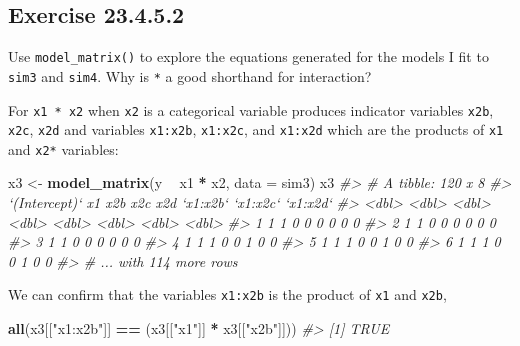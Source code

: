 \documentclass[]{book}
\newenvironment{Shaded}{\begin{snugshade}}{\end{snugshade}}
\newcommand{\CommentTok}[1]{\textcolor[rgb]{0.56,0.35,0.01}{\textit{#1}}}
\newcommand{\DataTypeTok}[1]{\textcolor[rgb]{0.13,0.29,0.53}{#1}}
\newcommand{\KeywordTok}[1]{\textcolor[rgb]{0.13,0.29,0.53}{\textbf{#1}}}
\newcommand{\NormalTok}[1]{#1}
\newcommand{\OperatorTok}[1]{\textcolor[rgb]{0.81,0.36,0.00}{\textbf{#1}}}
\newcommand{\StringTok}[1]{\textcolor[rgb]{0.31,0.60,0.02}{#1}}
\theoremstyle{plain}
\theoremstyle{remark}
\begin{document}
\hypertarget{exercise-23.4.5.2}{%
\subsection*{\texorpdfstring{Exercise
{23.4.5.2}}{Exercise 23.4.5.2}}\label{exercise-23.4.5.2}}

Use \texttt{model\_matrix()} to explore the equations generated for the
models I fit to \texttt{sim3} and \texttt{sim4}. Why is \texttt{*} a
good shorthand for interaction?

For \texttt{x1\ *\ x2} when \texttt{x2} is a categorical variable
produces indicator variables \texttt{x2b}, \texttt{x2c}, \texttt{x2d}
and variables \texttt{x1:x2b}, \texttt{x1:x2c}, and \texttt{x1:x2d}
which are the products of \texttt{x1} and \texttt{x2*} variables:

\begin{Shaded}
\begin{Highlighting}[]
\NormalTok{x3 <-}\StringTok{ }\KeywordTok{model_matrix}\NormalTok{(y }\OperatorTok{~}\StringTok{ }\NormalTok{x1 }\OperatorTok{*}\StringTok{ }\NormalTok{x2, }\DataTypeTok{data =}\NormalTok{ sim3)}
\NormalTok{x3}
\CommentTok{#> # A tibble: 120 x 8}
\CommentTok{#>   `(Intercept)`    x1   x2b   x2c   x2d `x1:x2b` `x1:x2c` `x1:x2d`}
\CommentTok{#>           <dbl> <dbl> <dbl> <dbl> <dbl>    <dbl>    <dbl>    <dbl>}
\CommentTok{#> 1             1     1     0     0     0        0        0        0}
\CommentTok{#> 2             1     1     0     0     0        0        0        0}
\CommentTok{#> 3             1     1     0     0     0        0        0        0}
\CommentTok{#> 4             1     1     1     0     0        1        0        0}
\CommentTok{#> 5             1     1     1     0     0        1        0        0}
\CommentTok{#> 6             1     1     1     0     0        1        0        0}
\CommentTok{#> # ... with 114 more rows}
\end{Highlighting}
\end{Shaded}

We can confirm that the variables \texttt{x1:x2b} is the product of
\texttt{x1} and \texttt{x2b},

\begin{Shaded}
\begin{Highlighting}[]
\KeywordTok{all}\NormalTok{(x3[[}\StringTok{"x1:x2b"}\NormalTok{]] }\OperatorTok{==}\StringTok{ }\NormalTok{(x3[[}\StringTok{"x1"}\NormalTok{]] }\OperatorTok{*}\StringTok{ }\NormalTok{x3[[}\StringTok{"x2b"}\NormalTok{]]))}
\CommentTok{#> [1] TRUE}
\end{Highlighting}
\end{Shaded}
\end{document}
